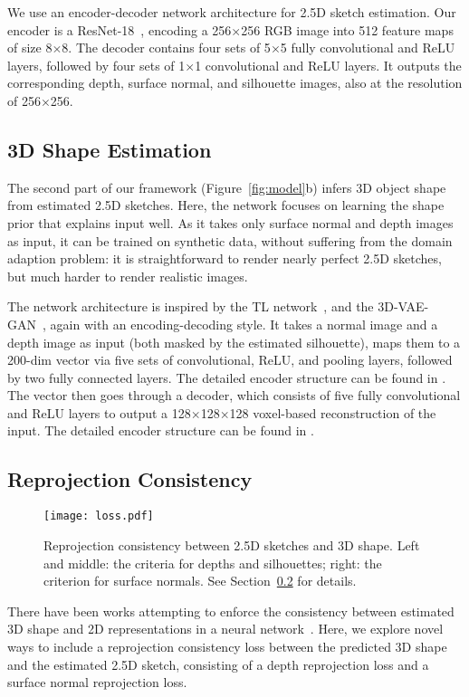 \documentclass{article}
\newcommand{\sect}[1]{Section~\ref{#1}}
\newcommand{\fig}[1]{Figure~\ref{#1}}
\begin{document}
We use an encoder-decoder network architecture for 2.5D sketch estimation. Our encoder is a ResNet-18~\citep{He2015}, encoding a 256$\times$256 RGB image into 512 feature maps of size 8$\times$8. The decoder contains four sets of 5$\times$5 fully convolutional and ReLU layers, followed by four sets of 1$\times$1 convolutional and ReLU layers. It outputs the corresponding depth, surface normal, and silhouette images, also at the resolution of 256$\times$256. 

\subsection{3D Shape Estimation}
\label{sec:step2}

The second part of our framework (\fig{fig:model}b) infers 3D object shape from estimated 2.5D sketches. Here, the network focuses on learning the shape prior that explains input well. As it takes only surface normal and depth images as input, it can be trained on synthetic data, without suffering from the domain adaption problem: it is straightforward to render nearly perfect 2.5D sketches, but much harder to render realistic images. 

The network architecture is inspired by the TL network~\citep{Girdhar2016}, and the 3D-VAE-GAN~\citep{Wu2016}, again with an encoding-decoding style. It takes a normal image and a depth image as input (both masked by the estimated silhouette), maps them to a 200-dim vector via five sets of convolutional, ReLU, and pooling layers,  followed by two fully connected layers. The detailed encoder structure can be found in \cite{Girdhar2016}. The vector then goes through a decoder, which consists of five fully convolutional and ReLU layers to output a 128$\times$128$\times$128 voxel-based reconstruction of the input. The detailed encoder structure can be found in \cite{Wu2016}.

\subsection{Reprojection Consistency}
\label{sec:reprojection}

\begin{figure}[t]
    \centering
    \texttt{[image: loss.pdf]}
    \caption{Reprojection consistency between 2.5D sketches and 3D shape. Left and middle: the criteria for depths and silhouettes; right: the criterion for surface normals. See \sect{sec:reprojection} for details.}
    \vspace{-5pt}
    \label{fig:projection}
\end{figure} 
There have been works attempting to enforce the consistency between estimated 3D shape and 2D representations in a neural network~\citep{Yan2016,Rezende2016,Wu2016b,tulsiani2017multi}. Here, we explore novel ways to include a reprojection consistency loss between the predicted 3D shape and the estimated 2.5D sketch, consisting of a depth reprojection loss and a surface normal reprojection loss. 
\end{document}
